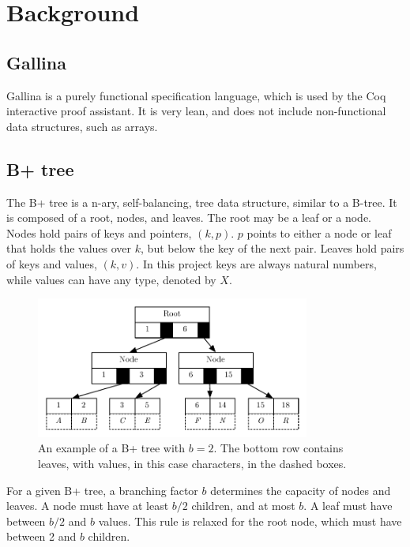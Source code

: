 \section{Background}
\label{sec:Background}

\subsection{Gallina}
Gallina is a purely functional specification language, which is used by the Coq interactive proof assistant. It is very lean, and does not include non-functional data structures, such as arrays. 

\subsection{B+ tree}
The B+ tree is a n-ary, self-balancing, tree data structure, similar to a B-tree. It is composed of a root, nodes, and leaves. The root may be a leaf or a node. Nodes hold pairs of keys and pointers, $(k, p)$. $p$ points to either a node or leaf that holds the values over $k$, but below the key of the next pair. Leaves hold pairs of keys and values, $(k, v)$. In this project keys are always natural numbers, while values can have any type, denoted by $X$. 

\begin{figure}
 \centering
   \includegraphics[width=90mm]{diagrams/BPlusTree.pdf}
 \caption{An example of a B+ tree with $b=2$. The bottom row contains leaves, with values, in this case characters, in the dashed boxes.}
 \label{fig:bplustree}
\end{figure}

For a given B+ tree, a branching factor $b$ determines the capacity of nodes and leaves. A node must have at least $b/2$ children, and at most $b$. A leaf must have between $b/2$ and $b$ values. This rule is relaxed for the root node, which must have between 2 and $b$ children.

